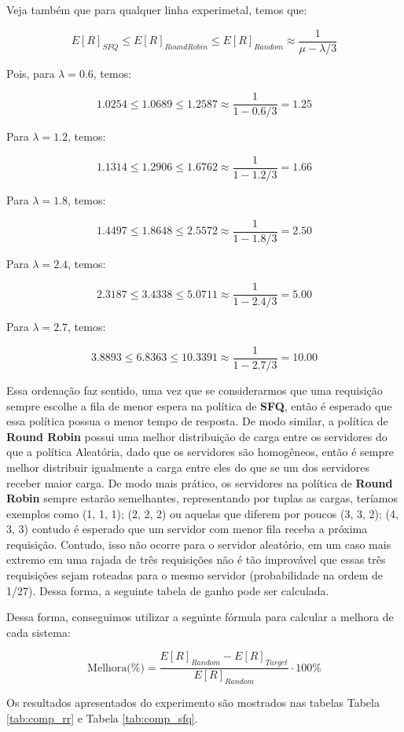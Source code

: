 \documentclass[conference]{IEEEtran}
\begin{document}
Veja também que para qualquer linha experimetal, temos que:

$$
E[R]_{SFQ} \leq E[R]_{Round Robin} \leq E[R]_{Random} \approx \frac{1}{\mu - \lambda/3}
$$

Pois, para $\lambda = 0.6$, temos:

$$
1.0254 \leq 1.0689 \leq 1.2587 \approx \frac{1}{1 - 0.6/3} = 1.25
$$

Para $\lambda = 1.2$, temos:

$$
1.1314 \leq 1.2906 \leq 1.6762 \approx \frac{1}{1 - 1.2/3} = 1.66
$$

Para $\lambda = 1.8$, temos:

$$
1.4497 \leq 1.8648 \leq 2.5572 \approx \frac{1}{1 - 1.8/3} = 2.50
$$

Para $\lambda = 2.4$, temos:

$$
2.3187 \leq 3.4338 \leq 5.0711 \approx \frac{1}{1 - 2.4/3} = 5.00
$$

Para $\lambda = 2.7$, temos:

$$
3.8893 \leq 6.8363 \leq 10.3391 \approx \frac{1}{1 - 2.7/3} = 10.00
$$

Essa ordenação faz sentido, uma vez que se considerarmos que uma requisição sempre escolhe a fila de menor espera na política de \textbf{SFQ}, então é esperado que essa política possua o menor tempo de resposta. De modo similar, a política de \textbf{Round Robin} possui uma melhor distribuição de carga entre os servidores do que a política Aleatória, dado que os servidores são homogêneos, então é sempre melhor distribuir igualmente a carga entre eles do que se um dos servidores receber maior carga. De modo mais prático, os servidores na política de \textbf{Round Robin} sempre estarão semelhantes, representando por tuplas as cargas, teríamos exemplos como (1, 1, 1); (2, 2, 2) ou aquelas que diferem por poucos (3, 3, 2); (4, 3, 3) contudo é esperado que um servidor com menor fila receba a próxima requisição. Contudo, isso não ocorre para o servidor aleatório, em um caso mais extremo em uma rajada de três requisições não é tão improvável que essas três requisições sejam roteadas para o mesmo servidor (probabilidade na ordem de 1/27). Dessa forma, a seguinte tabela de ganho pode ser calculada.

Dessa forma, conseguimos utilizar a seguinte fórmula para calcular a melhora de cada sistema:

$$
\text{Melhora(\%)} = \frac{E[R]_{Random} - E[R]_{Target}}{E[R]_{Random}} \cdot 100\%
$$

Os resultados apresentados do experimento são mostrados nas tabelas Tabela \ref{tab:comp_rr} e Tabela \ref{tab:comp_sfq}.
\end{document}
